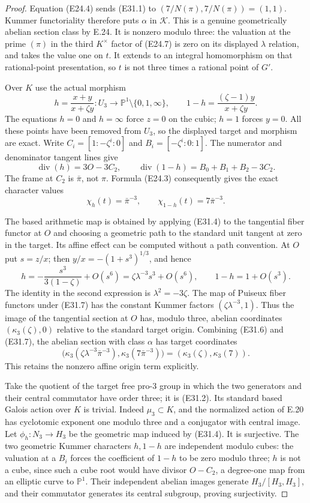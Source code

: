 \begin{proof}
Equation (E24.4) sends (E31.1) to
$(7/N(\pi),7/N(\pi))=(1,1)$.
Kummer functoriality therefore puts $\alpha$ in $\mathcal K$.
This is a genuine geometrically abelian section class by E.24.
It is nonzero modulo three: the valuation at the prime $(\pi)$
in the third $K^\times$ factor of (E24.7) is zero on its
displayed $\lambda$ relation, and takes the value one on $t$.
It extends to an integral homomorphism on that rational-point
presentation, so $t$ is not three times a rational point of $G'$.

Over $K$ use the actual morphism
\[
 h=\frac{x+y}{x+\zeta y}:
 U_3\longrightarrow\mathbb P^1\setminus\{0,1,\infty\},
 \qquad
 1-h=\frac{(\zeta-1)y}{x+\zeta y}.
 \tag{E31.4}
\]
The equations $h=0$ and $h=\infty$ force $z=0$ on the cubic;
$h=1$ forces $y=0$. All these points have been removed from
$U_3$, so the displayed target and morphism are exact.
Write $C_i=[1:-\zeta^i:0]$ and $B_i=[-\zeta^i:0:1]$.
The numerator and denominator tangent lines give
\[
 \operatorname{div}(h)=3O-3C_2,\qquad
 \operatorname{div}(1-h)=B_0+B_1+B_2-3C_2 .
 \tag{E31.5}
\]
The frame at $C_2$ is $\bar\pi$, not $\pi$.
Formula (E24.3) consequently gives the exact character values
\[
 \chi_h(t)=\bar\pi^{-3},\qquad
 \chi_{1-h}(t)=7\bar\pi^{-3}.
 \tag{E31.6}
\]

The based arithmetic map is obtained by applying (E31.4) to
the tangential fiber functor at $O$ and choosing a geometric
path to the standard unit tangent at zero in the target.
Its affine effect can be computed without a path convention.
At $O$ put $s=z/x$; then
$y/x=-(1+s^3)^{1/3}$, and hence
\[
 h=-\frac{s^3}{3(1-\zeta)}+O(s^6)
   =\zeta\lambda^{-3}s^3+O(s^6),
 \qquad 1-h=1+O(s^3).
 \tag{E31.7}
\]
The identity in the second expression is
$\lambda^2=-3\zeta$.
The map of Puiseux fiber functors under (E31.7) has the
constant Kummer factors $(\zeta\lambda^{-3},1)$.
Thus the image of the tangential section at $O$ has, modulo
three, abelian coordinates
$(\kappa_3(\zeta),0)$ relative to the standard target origin.
Combining (E31.6) and (E31.7), the abelian section with class
$\alpha$ has target coordinates
\[
 \bigl(\kappa_3(\zeta\lambda^{-3}\bar\pi^{-3}),
        \kappa_3(7\bar\pi^{-3})\bigr)
   =(\kappa_3(\zeta),\kappa_3(7)).
 \tag{E31.8}
\]
This retains the nonzero affine origin term explicitly.

Take the quotient of the target free pro-$3$ group in which
the two generators and their central commutator have order
three; it is (E31.2). Its standard based Galois action over
$K$ is trivial. Indeed $\mu_3\subset K$, and the normalized
action of E.20 has cyclotomic exponent one modulo three and
a conjugator with central image.
Let $\phi_h:N_3\to H_3$ be the geometric map induced by
(E31.4). It is surjective. The two geometric Kummer characters
$h,1-h$ are independent modulo cubes: the valuation at a
$B_i$ forces the coefficient of $1-h$ to be zero modulo
three; $h$ is not a cube, since such a cube root would have
divisor $O-C_2$, a degree-one map from an elliptic curve to
$\mathbb P^1$. Their independent abelian images generate
$H_3/[H_3,H_3]$, and their commutator generates its central
subgroup, proving surjectivity.


\end{proof}
